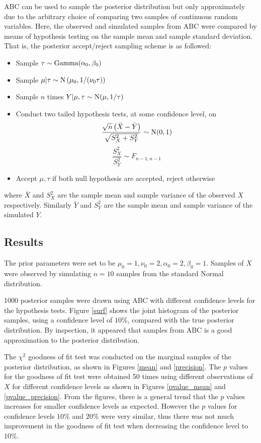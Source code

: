 \documentclass[a4paper]{proc}
\begin{document}
ABC can be used to sample the posterior distribution but only approximately due to the arbitrary choice of comparing two samples of continuous random variables. Here, the observed and simulated samples from ABC were compared by means of hypothesis testing on the sample mean and sample standard deviation. That is, the posterior accept/reject sampling scheme is as followed:
\begin{itemize}
	\item Sample $\tau\sim\textup{Gamma}(\alpha_0,\beta_0)$
	\item Sample $\mu|\tau\sim\textup{N}\left(\mu_0,1/(\nu_0\tau)\right)$
	\item Sample $n$ times $Y|\mu,\tau\sim\textup{N}(\mu,1/\tau)$
	\item Conduct two tailed hypothesis tests, at some confidence level, on
	\begin{equation}
	\dfrac{\sqrt{n}\left(\bar{X}-\bar{Y}\right)}{\sqrt{S_X^2+S_Y^2}}\sim\textup{N}(0,1)
	\end{equation}
	\begin{equation}
	\dfrac{S_X^2}{S_Y^2}\sim F_{n-1,n-1}
	\end{equation}
	\item Accept $\mu,\tau$ if both null hypothesis are accepted, reject otherwise
\end{itemize}
where $\bar{X}$ and $S_X^2$ are the sample mean and sample variance of the observed $X$ respectively. Similarly $\bar{Y}$ and $S_Y^2$ are the sample mean and sample variance of the simulated $Y$.

\subsection{Results}
The prior parameters were set to be $\mu_0=1,\nu_0=2,\alpha_0=2,\beta_0=1$. Samples of $X$ were observed by simulating $n=10$ samples from the standard Normal distribution.

1000 posterior samples were drawn using ABC with different confidence levels for the hypothesis tests. Figure \ref{surf} shows the joint histogram of the posterior samples, using a confidence level of $10\%$, compared with the true posterior distribution. By inspection, it appeared that samples from ABC is a good approximation to the posterior distribution.

The $\chi^2$ goodness of fit test was conducted on the marginal samples of the posterior distribution, as shown in Figures \ref{mean} and \ref{precision}. The $p$ values for the goodness of fit test were obtained 50 times using different observations of $X$ for different confidence levels as shown in Figures \ref{pvalue_mean} and \ref{pvalue_precision}. From the figures, there is a general trend that the $p$ values increases for smaller confidence levels as expected. However the $p$ values for confidence levels $10\%$ and $20\%$ were very similar, thus there was not much improvement in the goodness of fit test when decreasing the confidence level to $10\%.$
\end{document}
